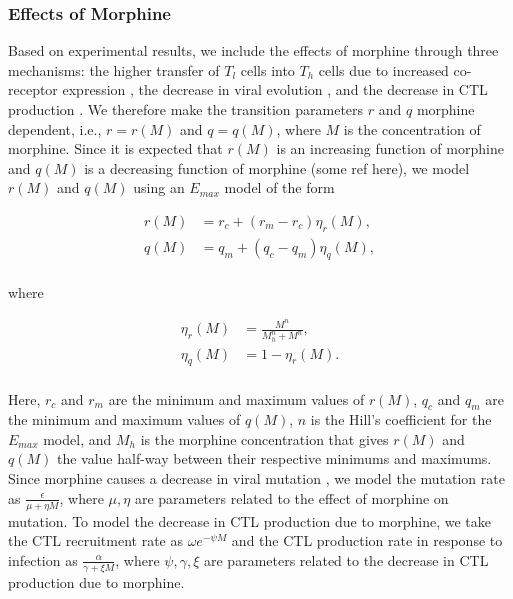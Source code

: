 \documentclass[11pt, oneside]{article}    %
\begin{document}
\subsubsection{Effects of Morphine}

	Based on experimental results, we include the effects of morphine through three mechanisms: the higher transfer of $T_l$ cells into $T_h$ cells due to increased co-receptor expression \cite{Kumar, Miyagi}, the decrease in viral evolution \cite{Noel2006, Noel2007}, and the decrease in CTL production \cite{Rivera-Amill}. We therefore make the transition parameters $r$ and $q$ morphine dependent, i.e., $r=r(M)$ and $q=q(M)$, where $M$ is the concentration of morphine. Since it is expected that $r(M)$ is an increasing function of morphine and $q(M)$ is a decreasing function of morphine (some ref here), we model $r(M)$ and $q(M)$ using an $E_{max}$ model of the form

\begin{align*}
r(M) &= r_c + (r_m - r_c) \eta_r(M),\\
q(M) &= q_m + (q_c - q_m) \eta_q (M),\\
\end{align*}

where 

\begin{align*}
\eta_r(M) &= \frac{M^n}{M_h^n + M^n},\\
\eta_q(M) &= 1- \eta_r(M).\\
\end{align*}

Here, $r_c$  and $r_m$ are the minimum and maximum values of $r(M)$, $q_c$ and $q_m$ are the minimum and maximum values of $q(M)$, $n$ is the Hill's coefficient for the $E_{max}$ model, and $M_h$ is the morphine concentration that gives $r(M)$ and $q(M)$ the value half-way between their respective minimums and maximums. Since morphine causes a decrease in viral mutation \cite{Noel2006,Noel2007}, we model the mutation rate as $\frac{\epsilon}{\mu + \eta M}$, where $\mu,\eta$ are parameters related to the effect of morphine on mutation. To model the decrease in CTL production due to morphine, we take the CTL recruitment rate as $\omega e^{-\psi M}$ and the CTL production rate in response to infection as $\frac{\alpha}{\gamma + \xi M}$, where $\psi, \gamma,\xi$ are parameters related to the decrease in CTL production due to morphine.

\end{document}
